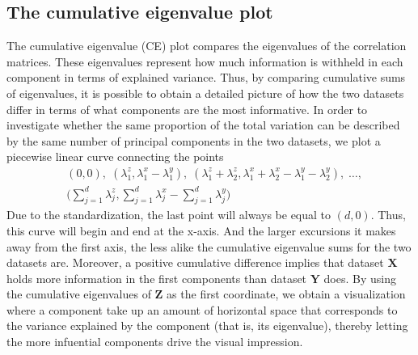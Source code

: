 \documentclass[a4paper,12pt]{article}
\begin{document}
\subsection*{The cumulative eigenvalue plot}
The cumulative eigenvalue (CE) plot compares the eigenvalues of the correlation matrices. These eigenvalues represent how much information is withheld in each component in terms of explained variance. Thus, by comparing cumulative sums of eigenvalues, it is possible to obtain a detailed picture of how the two datasets differ in terms of what components are the most informative. In order to investigate whether the same proportion of the total variation can be described by the same number of principal components in the two datasets, we plot a piecewise linear curve connecting the points
\begin{align*}
&(0,0), \;
(\lambda_1^z,\lambda_{1}^x-\lambda_{1}^y), \;
(\lambda_1^z + \lambda_2^z,\lambda_{1}^x+\lambda_{2}^x-\lambda_{1}^y-\lambda_{2}^y), \;
\ldots, \\
&\bigg( \sum_{j=1}^d \lambda_j^z, \sum_{j=1}^d \lambda_{j}^x - \sum_{j=1}^d \lambda_{j}^y \bigg)
\end{align*}
Due to the standardization, the last point will always be equal to $(d,0)$. Thus, this curve will begin and end at the x-axis. And the larger excursions it makes away from the  first axis, the less alike the cumulative eigenvalue sums for the two datasets are. Moreover, a positive cumulative difference implies that dataset $\mathbf{X}$ holds more information in the first components than dataset $\mathbf{Y}$ does. By using the cumulative eigenvalues of $\mathbf{Z}$ as the first coordinate, we obtain a visualization where a component take up an amount of horizontal space that corresponds to the variance explained by the component (that is, its eigenvalue), thereby letting the more infuential components drive the visual impression. 

\end{document}
